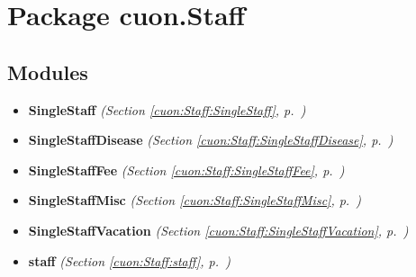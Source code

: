 %
%
%


\section{Package cuon.Staff}

    \label{cuon:Staff}


\subsection{Modules}

\begin{itemize}
\setlength{\parskip}{0ex}
\item \textbf{SingleStaff}
  \textit{(Section \ref{cuon:Staff:SingleStaff}, p.~\pageref{cuon:Staff:SingleStaff})}

\item \textbf{SingleStaffDisease}
  \textit{(Section \ref{cuon:Staff:SingleStaffDisease}, p.~\pageref{cuon:Staff:SingleStaffDisease})}

\item \textbf{SingleStaffFee}
  \textit{(Section \ref{cuon:Staff:SingleStaffFee}, p.~\pageref{cuon:Staff:SingleStaffFee})}

\item \textbf{SingleStaffMisc}
  \textit{(Section \ref{cuon:Staff:SingleStaffMisc}, p.~\pageref{cuon:Staff:SingleStaffMisc})}

\item \textbf{SingleStaffVacation}
  \textit{(Section \ref{cuon:Staff:SingleStaffVacation}, p.~\pageref{cuon:Staff:SingleStaffVacation})}

\item \textbf{staff}
  \textit{(Section \ref{cuon:Staff:staff}, p.~\pageref{cuon:Staff:staff})}

\end{itemize}


